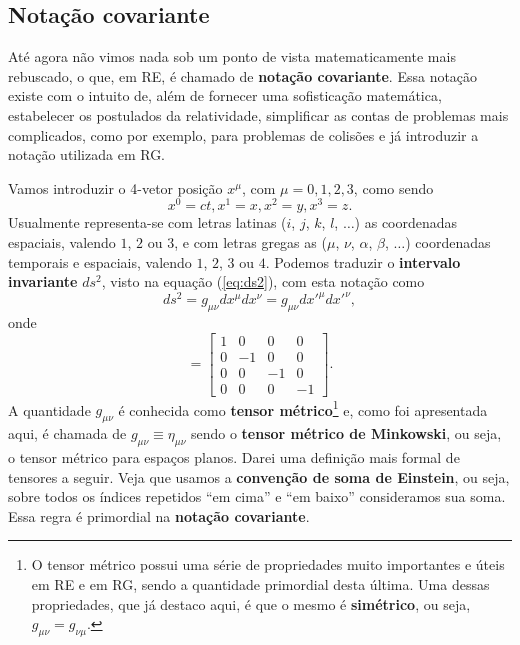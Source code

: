 \documentclass[12pt,a4paper,titlepage,brazil]{article}
\begin{document}

\subsection{Notação covariante}
\label{subsec:not_cov}

Até agora não vimos nada sob um ponto de vista matematicamente mais rebuscado, o que, em RE, é chamado de {\bf notação covariante}. Essa notação existe com o intuito de, além de fornecer uma sofisticação matemática, estabelecer os postulados da relatividade, simplificar as contas de problemas mais complicados, como por exemplo, para problemas de colisões e já introduzir a notação utilizada em RG.

Vamos introduzir o 4-vetor posição $x^{\mu}$, com $\mu = 0, 1, 2, 3$, como sendo
\begin{equation}
 x^0 = c t, x^1 = x, x^2 = y, x^3 = z . \label{eq:contrav}
\end{equation}
Usualmente representa-se com letras latinas ($i$, $j$, $k$, $l$, $\dots$) as coordenadas espaciais, valendo $1$, $2$ ou $3$, e com letras gregas as ($\mu$, $\nu$, $\alpha$, $\beta$, $\dots$) coordenadas temporais e espaciais, valendo $1$, $2$, $3$ ou $4$. Podemos traduzir o {\bf intervalo invariante} $d s^2$, visto na equação (\ref{eq:ds2}), com esta notação como
\begin{equation}
  d s^2 = g_{\mu \nu} d x^{\mu} d x^{\nu} = g_{\mu \nu} d x'^{\mu} d x'^{\nu} ,
\end{equation}  
onde
\begin{equation}
  [g_{\mu \nu}] = \left[\begin{array}{cccc}
                          1 & 0 & 0 & 0\\
                          0 & - 1 & 0 & 0 \\
                          0 & 0 & - 1 & 0 \\
                          0 & 0 & 0 & - 1
                                      \end{array}\right] . \label{eq:gmunu-P}
\end{equation}
A quantidade $g_{\mu \nu}$ é conhecida como {\bf tensor métrico}\footnote{O tensor métrico possui uma série de propriedades muito importantes e úteis em RE e em RG, sendo a quantidade primordial desta última. Uma dessas propriedades, que já destaco aqui, é que o mesmo é {\bf simétrico}, ou seja, $g_{\mu \nu} = g_{\nu \mu}$.} e, como foi apresentada aqui, é chamada de $g_{\mu \nu} \equiv \eta_{\mu \nu}$ sendo o {\bf tensor métrico de Minkowski}, ou seja, o tensor métrico para espaços planos. Darei uma definição mais formal de tensores a seguir. Veja que usamos a {\bf convenção de soma de Einstein}, ou seja, sobre todos os índices repetidos “em cima” e “em baixo” consideramos sua soma. Essa regra é primordial na {\bf notação covariante}.
\end{document}
